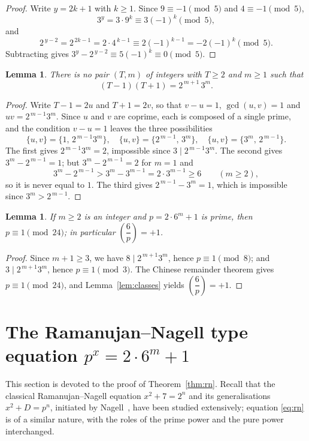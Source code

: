 \documentclass[preprint,12pt]{elsarticle}
\newtheorem{lemma}[theorem]{Lemma}
\theoremstyle{definition}
\newcommand{\leg}[2]{\left(\dfrac{#1}{#2}\right)}
\begin{document}
\begin{proof}
Write $y=2k+1$ with $k\geq 1$. Since $9\equiv -1\pmod 5$ and
$4\equiv -1\pmod 5$,
\[
3^{y}=3\cdot 9^{k}\equiv 3(-1)^{k} \pmod 5,
\]
and
\[
2^{\,y-2}=2^{\,2k-1}=2\cdot 4^{\,k-1}\equiv 2(-1)^{k-1}=-2(-1)^{k}\pmod 5.
\]
Subtracting gives $3^{y}-2^{\,y-2}\equiv 5(-1)^{k}\equiv 0\pmod 5$.
\end{proof}

\begin{lemma}\label{lem:consecutive}
There is no pair $(T,m)$ of integers with $T\geq 2$ and $m\geq 1$ such that
\[
(T-1)(T+1)=2^{\,m+1}\,3^{m}.
\]
\end{lemma}

\begin{proof}
Write $T-1=2u$ and $T+1=2v$, so that $v-u=1$, $\gcd(u,v)=1$ and
$uv=2^{\,m-1}3^{m}$. Since $u$ and $v$ are coprime, each is composed of a
single prime, and the condition $v-u=1$ leaves the three possibilities
\[
\{u,v\}=\bigl\{1,\,2^{\,m-1}3^{m}\bigr\},\quad
\{u,v\}=\bigl\{2^{\,m-1},\,3^{m}\bigr\},\quad
\{u,v\}=\bigl\{3^{m},\,2^{\,m-1}\bigr\}.
\]
The first gives $2^{\,m-1}3^{m}=2$, impossible since $3\mid 2^{\,m-1}3^{m}$.
The second gives $3^{m}-2^{\,m-1}=1$; but $3^{m}-2^{\,m-1}=2$ for $m=1$ and
\[
3^{m}-2^{\,m-1}>3^{m}-3^{m-1}=2\cdot 3^{m-1}\geq 6 \qquad(m\geq 2),
\]
so it is never equal to $1$. The third gives $2^{\,m-1}-3^{m}=1$, which is
impossible since $3^{m}>2^{\,m-1}$.
\end{proof}

\begin{lemma}\label{lem:mod24}
If $m\geq 2$ is an integer and $p=2\cdot 6^{m}+1$ is prime, then
$p\equiv 1\pmod{24}$; in particular $\leg{6}{p}=+1$.
\end{lemma}

\begin{proof}
Since $m+1\geq 3$, we have $8\mid 2^{\,m+1}3^{m}$, hence $p\equiv 1\pmod 8$;
and $3\mid 2^{\,m+1}3^{m}$, hence $p\equiv 1\pmod 3$. The Chinese remainder
theorem gives $p\equiv 1\pmod{24}$, and Lemma~\ref{lem:classes} yields
$\leg{6}{p}=+1$.
\end{proof}

\section{The Ramanujan--Nagell type equation $p^{x}=2\cdot 6^{m}+1$}%
\label{sec:rn}

This section is devoted to the proof of Theorem~\ref{thm:rn}. Recall that the
classical Ramanujan--Nagell equation $x^{2}+7=2^{n}$ and its generalisations
$x^{2}+D=p^{n}$, initiated by Nagell~\cite{Nagell1948}, have been studied
extensively; equation \eqref{eq:rn} is of a similar nature, with the roles of
the prime power and the pure power interchanged.
\end{document}
